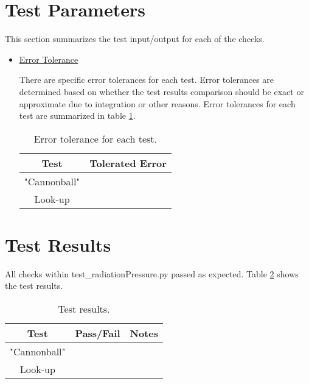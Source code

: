 \documentclass[]{BasiliskReportMemo}
\begin{document}
\section{Test Parameters}

This section summarizes the test input/output for each of the checks. 
\begin{itemize}
\item \underline{Error Tolerance}

There are specific error tolerances for each test. Error tolerances are determined based on whether the test results comparison should be exact or approximate due to integration or other reasons. Error tolerances for each test are summarized in table \ref{tab:errortol}. 

\begin{table}[htbp]
	\caption{Error tolerance for each test.}
	\label{tab:errortol}
	\centering \fontsize{10}{10}\selectfont
	\begin{tabular}{ c | c } %
		\hline
		\textbf{Test}   							& \textbf{Tolerated Error} 						  \\ \hline
		"Cannonball" &		   \\ \hline
		Look-up					& 														   \\ \hline
	\end{tabular}
\end{table}
\end{itemize}

\section{Test Results}

All checks within test\_radiationPressure.py passed as expected. Table \ref{tab:results} shows the test results.

\begin{table}[htbp]
	\caption{Test results.}
	\label{tab:results}
	\centering \fontsize{10}{10}\selectfont
	\begin{tabular}{c | c | c  } %
		\hline
		\textbf{Test} 				      & \textbf{Pass/Fail} 						   		   & \textbf{Notes} 									\\ \hline
		"Cannonball"	   			  	&      & 			 \\ \hline
		Look-up	   	                     &              &  \\ \hline
	\end{tabular}
\end{table}
\end{document}
